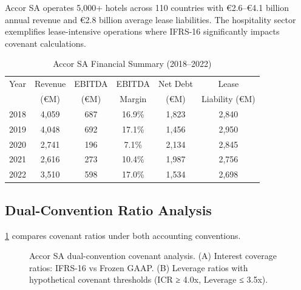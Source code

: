 \documentclass[11pt,a4paper]{article}
\theoremstyle{plain}
\theoremstyle{definition}
\newcommand{\Cref}[1]{\ref{#1}}
\begin{document}
Accor SA operates 5,000+ hotels across 110 countries with €2.6--€4.1 billion annual revenue and €2.8 billion average lease liabilities. The hospitality sector exemplifies lease-intensive operations where IFRS-16 significantly impacts covenant calculations.

\begin{table}[h]
\centering
\caption{Accor SA Financial Summary (2018--2022)}
\begin{tabular}{lccccc}
\toprule
Year & Revenue & EBITDA & EBITDA & Net Debt & Lease \\
& (€M) & (€M) & Margin & (€M) & Liability (€M) \\
\midrule
2018 & 4,059 & 687 & 16.9\% & 1,823 & 2,840 \\
2019 & 4,048 & 692 & 17.1\% & 1,456 & 2,950 \\
2020 & 2,741 & 196 & 7.1\% & 2,134 & 2,845 \\
2021 & 2,616 & 273 & 10.4\% & 1,987 & 2,756 \\
2022 & 3,510 & 598 & 17.0\% & 1,534 & 2,698 \\
\bottomrule
\end{tabular}
\label{tab:accor_data}
\end{table}

\subsection{Dual-Convention Ratio Analysis}

\Cref{fig:accor_ratios} compares covenant ratios under both accounting conventions.

\begin{figure}[h]
\centering
{}
\caption{Accor SA dual-convention covenant analysis. (A) Interest coverage ratios: IFRS-16 vs Frozen GAAP. (B) Leverage ratios with hypothetical covenant thresholds (ICR ≥ 4.0x, Leverage ≤ 3.5x).}
\label{fig:accor_ratios}
\end{figure}
\end{document}
